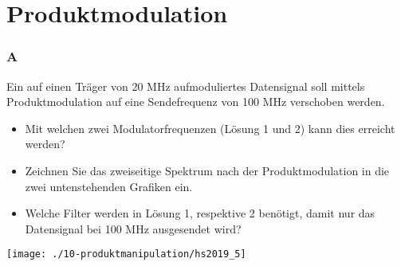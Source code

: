 

\section{Produktmodulation}

\subsubsection{A}
Ein auf einen Träger von 20 MHz aufmoduliertes Datensignal soll mittels Produktmodulation auf eine Sendefrequenz von 100 MHz verschoben werden.\\
\begin{itemize}
    \item Mit welchen zwei Modulatorfrequenzen (Lösung 1 und 2) kann dies erreicht werden?
    \item Zeichnen Sie das zweiseitige Spektrum nach der Produktmodulation in die zwei untenstehenden Grafiken ein.
    \item Welche Filter werden in Lösung 1, respektive 2 benötigt, damit nur das Datensignal bei 100 MHz ausgesendet wird?
\end{itemize}

\begin{center}
    \vspace{-8pt}
    \texttt{[image: ./10-produktmanipulation/hs2019\_5]}
    \vspace{-8pt}
\end{center}